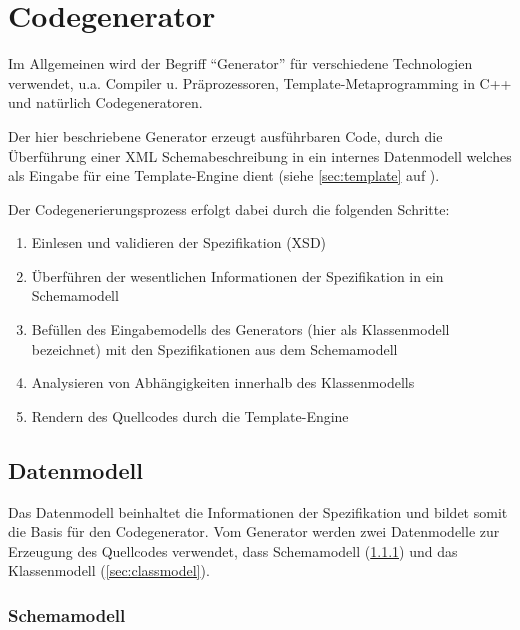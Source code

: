 \section{Codegenerator}


Im Allgemeinen wird der Begriff \enquote{Generator} für verschiedene Technologien verwendet, u.a. Compiler u. Präprozessoren, Template-Metaprogramming in C++ und natürlich Codegeneratoren.

Der hier beschriebene Generator erzeugt ausführbaren Code, durch die Überführung einer XML Schemabeschreibung in ein internes Datenmodell welches als Eingabe für eine Template-Engine dient (siehe \cref{sec:template} auf \pageref{sec:template}).

Der Codegenerierungsprozess erfolgt dabei durch die folgenden Schritte:

\begin{enumerate}
    \item Einlesen und validieren der Spezifikation (\gls{XSD})
    \item Überführen der wesentlichen Informationen der Spezifikation in ein Schemamodell
    \item Befüllen des Eingabemodells des Generators (hier als Klassenmodell bezeichnet) mit den Spezifikationen aus dem Schemamodell
    \item Analysieren von Abhängigkeiten innerhalb des Klassenmodells
    \item Rendern des Quellcodes durch die Template-Engine
\end{enumerate}



\subsection{Datenmodell}

Das Datenmodell beinhaltet die Informationen der Spezifikation und bildet somit die Basis für den Codegenerator.
Vom Generator werden zwei Datenmodelle zur Erzeugung des Quellcodes verwendet, dass Schemamodell (\cref{sec:schemamodel}) und das Klassenmodell (\cref{sec:classmodel}).

\subsubsection{Schemamodell}
\label{sec:schemamodel}

